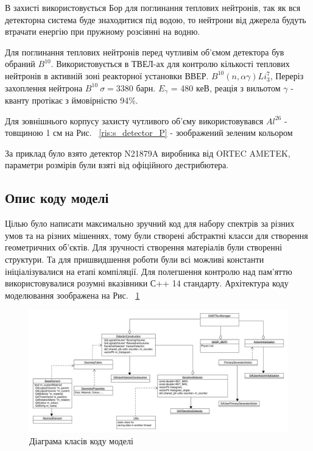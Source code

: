 \documentclass[a4paper, 14pt]{article}
\numberwithin{equation}{section}
\numberwithin{table}{section}
\begin{document}
	В захисті використовується Бор для поглинання теплових нейтронів, так як вся детекторна система буде знаходитися під водою, то нейтрони від джерела будуть втрачати енергію при пружному розсіянні на водню. 
	
	Для поглинання теплових нейтронів перед чутливім об'ємом детектора був обраний $B^{10}$. Використовується в ТВЕЛ-ах для контролю кількості теплових нейтронів в активній зоні реакторної установки ВВЕР. 
	$B^{10} ( n, \alpha \gamma)Li_3^7$, Переріз захоплення нейтрона $B^{10} \ \sigma = 3380$ барн.
	$E_\gamma$ = 480 кеВ, реація з вильотом $\gamma$ - кванту протікає з ймовірністю 94\%.
	
	Для зовнішнього корпусу захисту чутливого об'єму використовувався $Al^{26}$ - товщиною 1 см на Рис. ~\ref{ris:s_detector_P} - зоображений зеленим кольором 
	
	За приклад було взято детектор N21879A виробника від ORTEC AMETEK, параметри розмірів були взяті від офіційного дестрибютера.
	
\subsection{Опис коду моделі}
Цілью було написати максимально зручний код для набору спектрів за різних умов та на різних мішеннях, тому були створені абстрактні класси для створення геометричних об'єктів. Для зручності створення матеріалів були створенні структури. 
Та для пришвидшення роботи були всі можливі константи ініціалізувалися на етапі компіляції. Для полегшення контролю над пам'яттю використовувалися розумні вказівники С++ 14 стандарту. Архітектура коду моделювання зоображена на Рис. ~\ref{ris:s_classDiagram} 
\begin{figure}[hbt!]
	\centering \includegraphics[width=1\textwidth]{res/classDiagram.pdf}
	\caption{Діаграма класів коду моделі} 
	\label{ris:s_classDiagram}	
\end{figure} 
\end{document}
